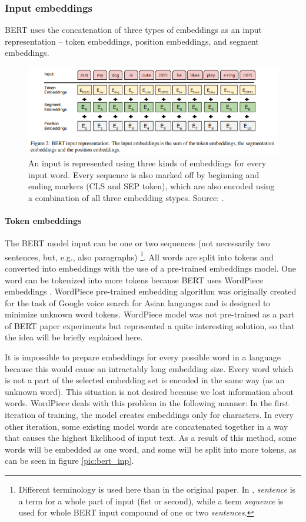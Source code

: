 \subsubsection{Input embeddings}
BERT uses the concatenation of three types of embeddings as an input representation -- token embeddings, position embeddings, and segment embeddings.
\begin{figure}[ht]
\centering
\includegraphics[width=1\columnwidth]{../img/bert_embeddings}
\protect\caption{ An input is represented using three kinds of embeddings for every input word. Every sequence is also marked off by beginning and ending markers (CLS and SEP token), which are also encoded using a combination of all three embedding stypes.
Source: \textit{\citep{Devlin2019}}.}
\label{pic:bert_emb}
\end{figure}
\paragraph{Token embeddings}
The BERT model input can be one or two sequences (not necessarily two sentences, but, e.g., also paragraphs) \footnote{Different terminology is used here than in the original paper. In \citep{Devlin2019}, \textit{sentence} is a term for a whole part of input (fist or second), while a term \textit{sequence} is used for whole BERT input compound of one or two \textit{sentences}.}. All words are split into tokens and converted into embeddings with the use of a pre-trained embeddings model. One word can be tokenized into more tokens because BERT uses WordPiece
embeddings \citep{Wu2016}. WordPiece pre-trained embedding algorithm was originally created for the task of Google voice search for Asian languages and is designed to minimize unknown word tokens. WordPiece model was not pre-trained as a part of BERT paper experiments but represented a quite interesting solution, so that the idea will be briefly explained here.
\par
It is impossible to prepare embeddings for every possible word in a language because this would cause an intractably long embedding size. %
Every word which is not a part of the selected embedding set is encoded in the same way (as an unknown word). This situation is not desired because we lost information about words. WordPiece deals with this problem in the following manner: In the first iteration of training, the model creates embeddings only for characters. In every other iteration, some existing model words are concatenated together in a way that causes the highest likelihood of input text. As a result of this method, some words will be embedded as one word, and some will be split into more tokens, as can be seen in figure \ref{pic:bert_inp}.

